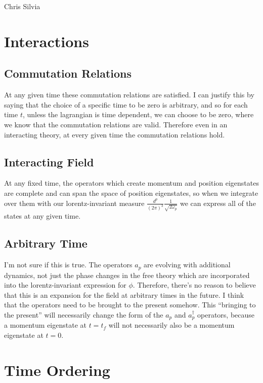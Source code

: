 \documentclass{article}
\begin{document}
\begin{flushright}
	Chris Silvia
\end{flushright}

\section{Interactions}

\subsection{Commutation Relations}

At any given time these commutation relations are satisfied.
I can justify this by saying that the choice of a specific time
	to be zero is arbitrary, and so for each time $t$, unless
	the lagrangian is time dependent, we can choose to be zero,
	where we know that the commutation relations are valid.
Therefore even in an interacting theory, at every given time
	the commutation relations hold.

\subsection{Interacting Field}

At any fixed time, the operators which create momentum and position eigenstates
	are complete and can span the space of position eigenstates, so when
	we integrate over them with our lorentz-invariant measure 
	$\frac{d^p}{(2\pi)^3} \frac{1}{\sqrt{2 \omega_p}}$ we can express all of the 
	states at any given time.

\subsection{Arbitrary Time}

I'm not sure if this is true.
The operators $a_p$ are evolving with additional dynamics, not just the phase
	changes in the free theory which are incorporated into the lorentz-invariant
	expression for $\phi$.
Therefore, there's no reason to believe that this is an expansion for the field
	at arbitrary times in the future.
I think that the operators need to be brought to the present somehow.
This ``bringing to the present'' will necessarily change the form of the $a_p$ and
	$a_p^\dagger$ operators, because a momentum eigenstate at $t=t_f$ will not
	necessarily also be a momentum eigenstate at $t = 0$.

\section{Time Ordering}
\end{document}
